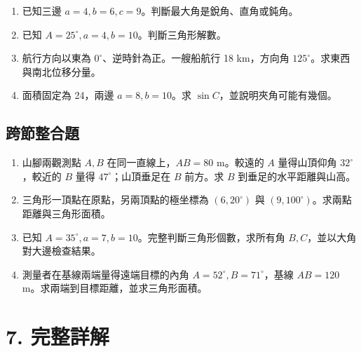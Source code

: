 \documentclass[11pt,a4paper]{article}
\providecommand{\tightlist}{%
  \setlength{\itemsep}{0pt}\setlength{\parskip}{0pt}}
\begin{document}
\begin{enumerate}
\def\labelenumi{\arabic{enumi}.}
\setcounter{enumi}{8}
\tightlist
\item
  已知三邊 \(a=4,b=6,c=9\)。判斷最大角是銳角、直角或鈍角。
\item
  已知 \(A=25^\circ,a=4,b=10\)。判斷三角形解數。
\item
  航行方向以東為 \(0^\circ\)、逆時針為正。一艘船航行 18 km，方向角 \(125^\circ\)。求東西與南北位移分量。
\item
  面積固定為 24，兩邊 \(a=8,b=10\)。求 \(\sin C\)，並說明夾角可能有幾個。
\end{enumerate}

\subsection{跨節整合題}\label{ux8de8ux7bc0ux6574ux5408ux984c}

\begin{enumerate}
\def\labelenumi{\arabic{enumi}.}
\setcounter{enumi}{12}
\tightlist
\item
  山腳兩觀測點 \(A,B\) 在同一直線上，\(AB=80\) m。較遠的 \(A\) 量得山頂仰角 \(32^\circ\)，較近的 \(B\) 量得 \(47^\circ\)；山頂垂足在 \(B\) 前方。求 \(B\) 到垂足的水平距離與山高。
\item
  三角形一頂點在原點，另兩頂點的極坐標為 \((6,20^\circ)\) 與 \((9,100^\circ)\)。求兩點距離與三角形面積。
\item
  已知 \(A=35^\circ,a=7,b=10\)。完整判斷三角形個數，求所有角 \(B,C\)，並以大角對大邊檢查結果。
\item
  測量者在基線兩端量得遠端目標的內角 \(A=52^\circ,B=71^\circ\)，基線 \(AB=120\) m。求兩端到目標距離，並求三角形面積。
\end{enumerate}

\section{7. 完整詳解}\label{ux5b8cux6574ux8a73ux89e3}
\end{document}
